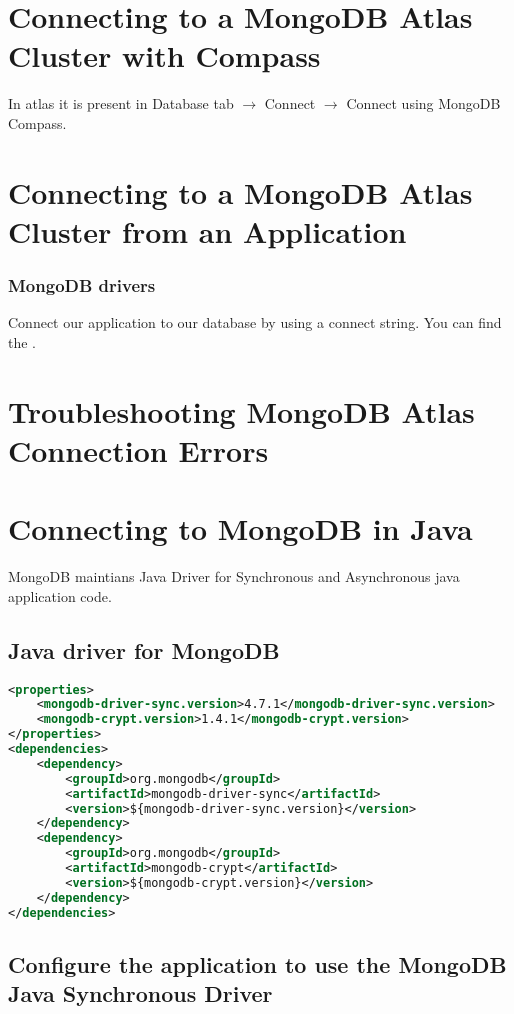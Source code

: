 \documentclass[../main.tex]{subfiles}
\begin{document}
\section{Connecting to a MongoDB Atlas Cluster with Compass}
In atlas it is present in Database tab $\rightarrow$ Connect $\rightarrow$ Connect using MongoDB Compass.

\section{Connecting to a MongoDB Atlas Cluster from an Application}
\subsubsection{MongoDB drivers} 
Connect our application to our database by using a connect string.
You can find the \href{mongodb.com/docs/drivers}{\color{blue}{mongodb drivers list here}}.

\section{Troubleshooting MongoDB Atlas Connection Errors}
\section{Connecting to MongoDB in Java}
MongoDB maintians Java Driver for Synchronous and Asynchronous java application code.
\subsection{Java driver for MongoDB}
\begin{lstlisting}[caption=pom.xml MongoDB Java Driver,language=XML]
<properties>
	<mongodb-driver-sync.version>4.7.1</mongodb-driver-sync.version>
	<mongodb-crypt.version>1.4.1</mongodb-crypt.version>
</properties>
<dependencies>
	<dependency>
		<groupId>org.mongodb</groupId>
		<artifactId>mongodb-driver-sync</artifactId>
		<version>${mongodb-driver-sync.version}</version>
	</dependency>
	<dependency>
		<groupId>org.mongodb</groupId>
		<artifactId>mongodb-crypt</artifactId>
		<version>${mongodb-crypt.version}</version>
	</dependency>
</dependencies>
\end{lstlisting}

\subsection{Configure the application to use the MongoDB Java Synchronous Driver}
\end{document}
